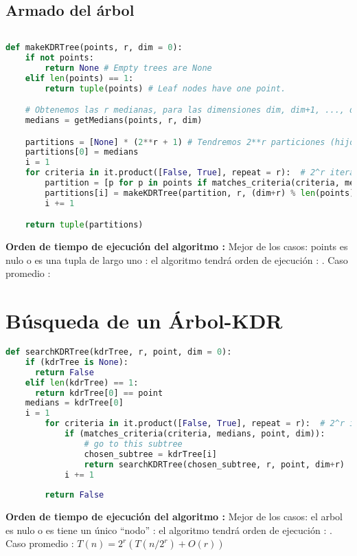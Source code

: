 \subsection{Armado del árbol}


  
\begin{lstlisting}[language=Python]
	
def makeKDRTree(points, r, dim = 0):
	if not points:
		return None # Empty trees are None
	elif len(points) == 1:
		return tuple(points) # Leaf nodes have one point.

	# Obtenemos las r medianas, para las dimensiones dim, dim+1, ..., dim+(r-1)
	medians = getMedians(points, r, dim)

	partitions = [None] * (2**r + 1) # Tendremos 2**r particiones (hijos)
	partitions[0] = medians
	i = 1
	for criteria in it.product([False, True], repeat = r):  # 2^r iteraciones
		partition = [p for p in points if matches_criteria(criteria, medians, p, dim)] # n iteraciones
		partitions[i] = makeKDRTree(partition, r, (dim+r) % len(points))
		i += 1

	return tuple(partitions)
	\end{lstlisting}
\textbf{ Orden de tiempo de ejecución del algoritmo : }
{Mejor de los casos: points es nulo o es una tupla de largo uno : 
el algoritmo tendrá orden de ejecución : .
Caso promedio : 
}

\section{Búsqueda de un Árbol-KDR}
\begin{lstlisting}[language=Python]
  def searchKDRTree(kdrTree, r, point, dim = 0):
    if (kdrTree is None):
      return False
    elif len(kdrTree) == 1:
      return kdrTree[0] == point
    medians = kdrTree[0]
    i = 1
		for criteria in it.product([False, True], repeat = r):  # 2^r iteraciones
			if (matches_criteria(criteria, medians, point, dim)):
				# go to this subtree
				chosen_subtree = kdrTree[i]
				return searchKDRTree(chosen_subtree, r, point, dim+r)
			i += 1
	
		return False
		\end{lstlisting}
	\textbf{ Orden de tiempo de ejecución del algoritmo : }
		Mejor de los casos: el arbol es nulo o es tiene un único ``nodo'' : 
		el algoritmo tendrá orden de ejecución : .
		Caso promedio : \(T(n)= 2^r (T(n/2^r)+ O(r))\)

